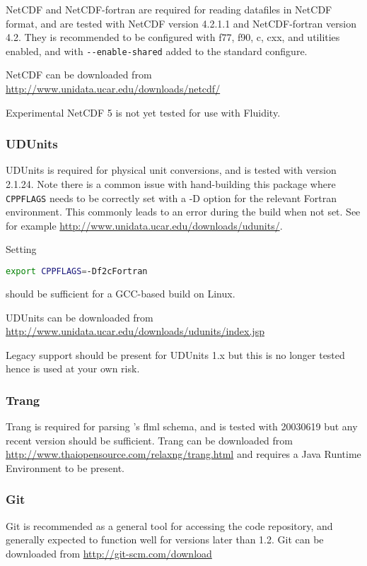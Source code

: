 NetCDF and NetCDF-fortran are required for reading datafiles in NetCDF format,
and are tested with NetCDF version 4.2.1.1 and NetCDF-fortran version 4.2. They
is recommended to be configured with f77, f90, c, cxx, and utilities enabled,
and with \lstinline[language=bash]+--enable-shared+ added to the standard
configure. 

NetCDF can be downloaded from \url{http://www.unidata.ucar.edu/downloads/netcdf/}

Experimental NetCDF 5 is not yet tested for use with Fluidity.

\subsubsection{UDUnits}
\label{sec:required_libraries_supporting_udunits}

UDUnits is required for physical unit conversions, and is tested with version
2.1.24. Note there is a common issue with hand-building this package where
\lstinline[language=bash]+CPPFLAGS+ needs to be correctly set with a -D
option for the relevant Fortran environment. This commonly leads to an error
during the build when not set. See for example
\url{http://www.unidata.ucar.edu/downloads/udunits/}.

Setting

\begin{lstlisting}[language=bash]
export CPPFLAGS=-Df2cFortran
\end{lstlisting}

should be sufficient for a GCC-based build on Linux.

UDUnits can be downloaded from \url{http://www.unidata.ucar.edu/downloads/udunits/index.jsp}

Legacy support should be present for UDUnits 1.x but this is no longer tested 
hence is used at your own risk.

\subsubsection{Trang}
\label{sec:required_libraries_supporting_trang}

Trang is required for parsing \fluidity's flml schema, and is tested with
20030619 but any recent version should be sufficient. Trang can be downloaded
from \url{http://www.thaiopensource.com/relaxng/trang.html} and requires a
Java Runtime Environment to be present.

\subsubsection{Git}
\label{sec:required_libraries_supporting_git}

Git is recommended as a general tool for accessing the \fluidity code
repository, and generally expected to function well for versions later than
1.2. Git can be downloaded from \url{http://git-scm.com/download}
